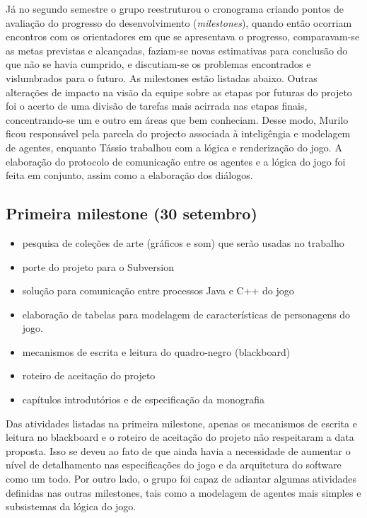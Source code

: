 Já no segundo semestre o grupo reestruturou o cronograma criando pontos de avaliação do progresso do desenvolvimento (\emph{milestones}), quando então ocorriam encontros com os orientadores em que se apresentava o progresso, comparavam-se as metas previstas e alcançadas, faziam-se novas estimativas para conclusão do que não se havia cumprido, e discutiam-se os problemas encontrados e vislumbrados para o futuro. As milestones estão listadas abaixo. Outras alterações de impacto na visão da equipe sobre as etapas por futuras do projeto foi o acerto de uma divisão de tarefas mais acirrada nas etapas finais, concentrando-se um e outro em áreas que bem conheciam. Desse modo, Murilo ficou responsável pela parcela do projecto associada à inteligêngia e modelagem de agentes, enquanto Tássio trabalhou com a lógica e renderização do jogo. A elaboração do protocolo de comunicação entre os agentes e a lógica do jogo foi feita em conjunto, assim como a elaboração dos diálogos.

\subsection{Primeira milestone (30 setembro)}
\begin{itemize}
\item pesquisa de coleções de arte (gráficos e som) que serão usadas no trabalho
\item porte do projeto para o Subversion
\item solução para comunicação entre processos Java e C++ do jogo
\item elaboração de tabelas para modelagem de características de personagens do jogo.
\item mecanismos de escrita e leitura do quadro-negro (blackboard)
\item roteiro de aceitação do projeto
\item capítulos introdutórios e de especificação da monografia
\end{itemize}

Das atividades listadas na primeira milestone, apenas os mecanismos de escrita e leitura no blackboard e o roteiro de aceitação do projeto não respeitaram a data proposta. Isso se deveu ao fato de que ainda havia a necessidade de aumentar o nível de detalhamento  nas especificações do jogo e da arquitetura do software como um todo. Por outro lado, o grupo foi capaz de adiantar algumas atividades definidas nas outras milestones, tais como a modelagem de agentes mais simples e subsistemas da lógica do jogo.

